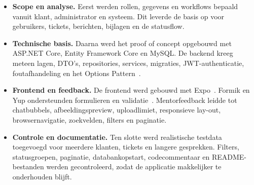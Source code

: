\begin{itemize}[itemsep=0.25\baselineskip, topsep=0.25\baselineskip, leftmargin=*]
  \item \textbf{Scope en analyse.} Eerst werden rollen, gegevens en workflows bepaald vanuit klant, administrator en systeem. Dit leverde de basis op voor gebruikers, tickets, berichten, bijlagen en de statusflow.
  \item \textbf{Technische basis.} Daarna werd het proof of concept opgebouwd met ASP.NET Core, Entity Framework Core en MySQL. De backend kreeg meteen lagen, DTO's, repositories, services, migraties, JWT-authenticatie, foutafhandeling en het Options Pattern~\autocite{MicrosoftOptionsPattern2026}.
  \item \textbf{Frontend en feedback.} De frontend werd gebouwd met Expo~\autocite{ExpoDocs2026}. Formik en Yup ondersteunden formulieren en validatie~\autocite{FormikDocs2026,YupDocs2026}. Mentorfeedback leidde tot chatbubbels, afbeeldingspreview, uploadlimiet, responsieve lay-out, browsernavigatie, zoekvelden, filters en paginatie.
  \item \textbf{Controle en documentatie.} Ten slotte werd realistische testdata toegevoegd voor meerdere klanten, tickets en langere gesprekken. Filters, statusgroepen, paginatie, databankopstart, codecommentaar en README-bestanden werden gecontroleerd, zodat de applicatie makkelijker te onderhouden blijft.
\end{itemize}
